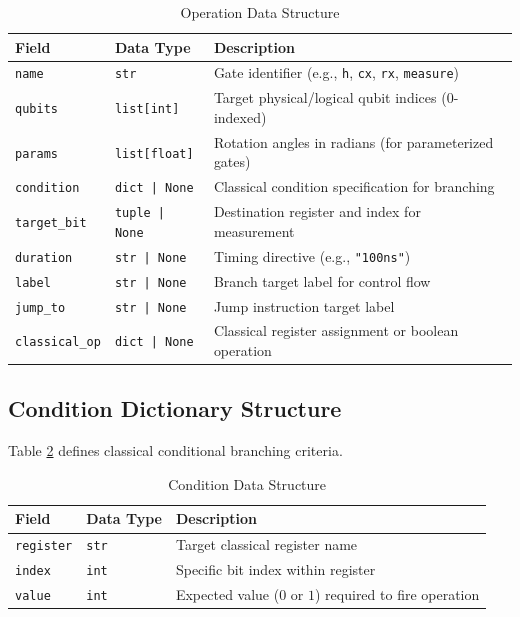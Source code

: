 \begin{table}[H]
\centering
\caption{Operation Data Structure}
\label{tab:op_struct}
\begin{tabular}{|p{3cm}|p{3cm}|p{7.5cm}|}
\hline
\textbf{Field} & \textbf{Data Type} & \textbf{Description} \\
\hline
\texttt{name} & \texttt{str} & Gate identifier (e.g., \texttt{h}, \texttt{cx}, \texttt{rx}, \texttt{measure}) \\
\hline
\texttt{qubits} & \texttt{list[int]} & Target physical/logical qubit indices (0-indexed) \\
\hline
\texttt{params} & \texttt{list[float]} & Rotation angles in radians (for parameterized gates) \\
\hline
\texttt{condition} & \texttt{dict | None} & Classical condition specification for branching \\
\hline
\texttt{target\_bit} & \texttt{tuple | None} & Destination register and index for measurement \\
\hline
\texttt{duration} & \texttt{str | None} & Timing directive (e.g., \texttt{"100ns"}) \\
\hline
\texttt{label} & \texttt{str | None} & Branch target label for control flow \\
\hline
\texttt{jump\_to} & \texttt{str | None} & Jump instruction target label \\
\hline
\texttt{classical\_op} & \texttt{dict | None} & Classical register assignment or boolean operation \\
\hline
\end{tabular}
\end{table}

\subsection{Condition Dictionary Structure}
Table \ref{tab:cond_struct} defines classical conditional branching criteria.

\begin{table}[H]
\centering
\caption{Condition Data Structure}
\label{tab:cond_struct}
\begin{tabular}{|p{3cm}|p{2.5cm}|p{8cm}|}
\hline
\textbf{Field} & \textbf{Data Type} & \textbf{Description} \\
\hline
\texttt{register} & \texttt{str} & Target classical register name \\
\hline
\texttt{index} & \texttt{int} & Specific bit index within register \\
\hline
\texttt{value} & \texttt{int} & Expected value ($0$ or $1$) required to fire operation \\
\hline
\end{tabular}
\end{table}

